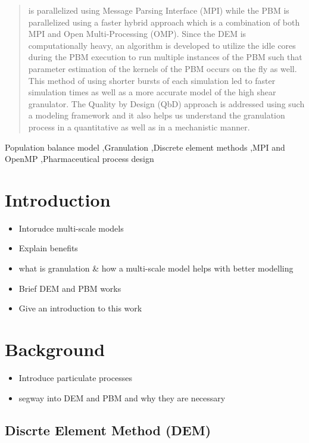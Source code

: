 \documentclass[preprint,11pt,authoryear]{elsarticle}
\begin{document}
\begin{frontmatter}
\begin{abstract}
is parallelized using Message Parsing Interface (MPI) while the PBM is parallelized using a faster
hybrid approach which is a combination of both MPI and Open Multi-Processing (OMP). Since
the DEM is computationally heavy, an algorithm is developed to utilize the idle cores during the
PBM execution to run multiple instances of the PBM such that parameter estimation of the kernels
of the PBM occurs on the fly as well. This method of using shorter bursts of each simulation led to
faster simulation times as well as a more accurate model of the high shear granulator. The Quality
by Design (QbD) approach is addressed using such a modeling framework and it also helps us
understand the granulation process in a quantitative as well as in a mechanistic manner. \citep{barrasso2015cerd}
\end{abstract}
\begin{keyword}
Population balance model \sep Granulation \sep Discrete element methods  \sep MPI and OpenMP 
\sep Pharmaceutical process design
\end{keyword}
\end{frontmatter}
\section{Introduction}
\begin{itemize}
\item{Intorudce multi-scale models}
\item{Explain benefits}
\item{what is granulation \& how a multi-scale model helps with better modelling}
\item{Brief DEM and PBM works}
\item{Give an introduction to this work}
\end{itemize}

\section{Background}
\begin{itemize}
\item{Introduce particulate processes}
\item{segway into DEM and PBM and why they are necessary}
\end{itemize}

\subsection{Discrte Element Method (DEM)}
\end{document}
